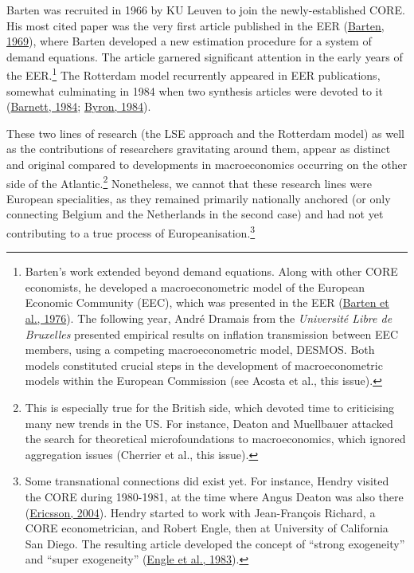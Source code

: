 \documentclass[
  12pt,
  onecolumn]{article}
\begin{document}
Barten was recruited in 1966 by KU Leuven to join the newly-established
CORE. His most cited paper was the very first article published in the
EER (\protect\hyperlink{ref-barten1969}{Barten, 1969}), where Barten
developed a new estimation procedure for a system of demand equations.
The article garnered significant attention in the early years of the
EER.\footnote{Barten's work extended beyond demand equations. Along with
  other CORE economists, he developed a macroeconometric model of the
  European Economic Community (EEC), which was presented in the EER
  (\protect\hyperlink{ref-barten1976}{Barten et al., 1976}). The
  following year, André Dramais from the \emph{Université Libre de
  Bruxelles} presented empirical results on inflation transmission
  between EEC members, using a competing macroeconometric model, DESMOS.
  Both models constituted crucial steps in the development of
  macroeconometric models within the European Commission (see Acosta et
  al., this issue).} The Rotterdam model recurrently appeared in EER
publications, somewhat culminating in 1984 when two synthesis articles
were devoted to it (\protect\hyperlink{ref-barnett1984}{Barnett, 1984};
\protect\hyperlink{ref-byron1984}{Byron, 1984}).

These two lines of research (the LSE approach and the Rotterdam model)
as well as the contributions of researchers gravitating around them,
appear as distinct and original compared to developments in
macroeconomics occurring on the other side of the Atlantic.\footnote{This
  is especially true for the British side, which devoted time to
  criticising many new trends in the US. For instance, Deaton and
  Muellbauer attacked the search for theoretical microfoundations to
  macroeconomics, which ignored aggregation issues (Cherrier et al.,
  this issue).} Nonetheless, we cannot that these research lines were
European specialities, as they remained primarily nationally anchored
(or only connecting Belgium and the Netherlands in the second case) and
had not yet contributing to a true process of
Europeanisation.\footnote{Some transnational connections did exist yet.
  For instance, Hendry visited the CORE during 1980-1981, at the time
  where Angus Deaton was also there
  (\protect\hyperlink{ref-ericsson2004}{Ericsson, 2004}). Hendry started
  to work with Jean-François Richard, a CORE econometrician, and Robert
  Engle, then at University of California San Diego. The resulting
  article developed the concept of ``strong exogeneity'' and ``super
  exogeneity'' (\protect\hyperlink{ref-engle1983}{Engle et al., 1983}).}
\end{document}
